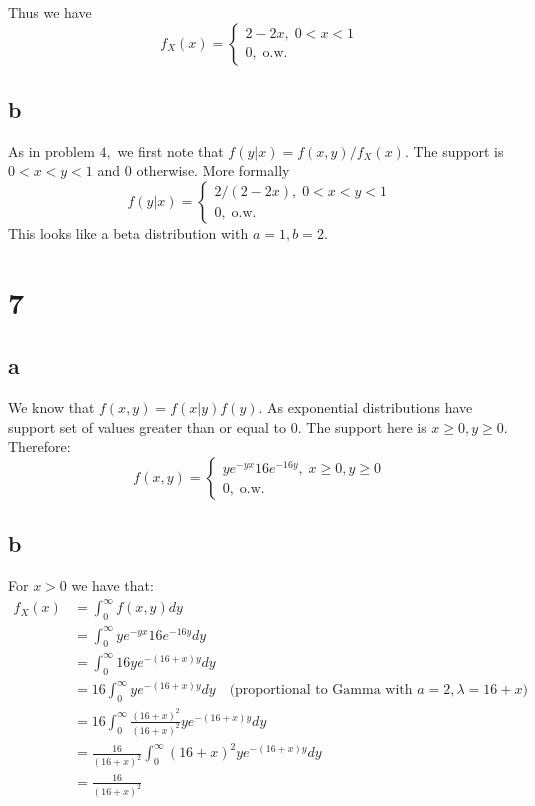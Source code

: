 \documentclass[10pt]{article}
\begin{document}
Thus we have
\begin{equation*}
    f_X(x) = \begin{cases}
        2-2x,\;0<x<1\\
        0,\;\text{o.w.}
    \end{cases}
\end{equation*}
\subsection*{b}
As in problem $4,$ we first note that $f(y|x) = f(x,y)/f_X(x).$
The support is $0<x<y<1$ and $0$ otherwise. More formally
\begin{equation*}
    f(y|x) = \begin{cases}
        2/(2-2x),\;0<x<y<1\\
        0,\;\text{o.w.}
    \end{cases}
\end{equation*}
This looks like a beta distribution with $a=1,b=2.$

\section*{7}
\subsection*{a}
We know that $f(x,y) = f(x|y)f(y).$ As exponential distributions have support set of values greater than or equal to $0.$ The support here is $x\ge0,y\ge0.$ Therefore:
\begin{equation*}
    f(x,y)=\begin{cases}
        ye^{-yx}16e^{-16y},\;x\ge0,y\ge0\\
        0,\;\text{o.w.} 
    \end{cases}
\end{equation*}

\subsection*{b}

For $x>0$ we have that:
\begin{align*}
    f_X(x) &= \int_0^\infty f(x,y)dy\\
    &=\int_0^\infty  ye^{-yx}16e^{-16y}dy\\
    &=\int_0^\infty 16ye^{-(16+x)y}dy\\
    &= 16\int_0^\infty ye^{-(16+x)y}dy \quad \text{(proportional to Gamma with $a=2,\lambda=16+x$)}\\%
    &= 16\int_0^\infty\frac{(16+x)^2}{(16+x)^2}ye^{-(16+x)y}dy\\
    &= \frac{16}{(16+x)^2}\int_0^\infty (16+x)^2ye^{-(16+x)y}dy\\
    &=\frac{16}{(16+x)^2}
\end{align*}
\end{document}
